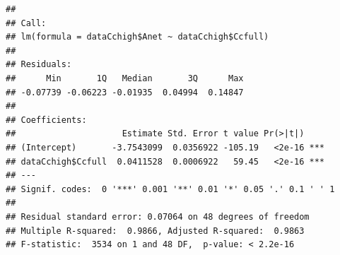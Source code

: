 \documentclass[
]{krantz}
\makeatletter
\newenvironment{Shaded}{\begin{snugshade}}{\end{snugshade}}
\newcommand{\DecValTok}[1]{\textcolor[rgb]{0.00,0.00,0.81}{#1}}
\newcommand{\KeywordTok}[1]{\textcolor[rgb]{0.13,0.29,0.53}{\textbf{#1}}}
\newcommand{\NormalTok}[1]{#1}
\newcommand{\OperatorTok}[1]{\textcolor[rgb]{0.81,0.36,0.00}{\textbf{#1}}}
\newcommand{\StringTok}[1]{\textcolor[rgb]{0.31,0.60,0.02}{#1}}
\newenvironment{kframe}{%
\medskip{}
\setlength{\fboxsep}{.8em}
 \def\at@end@of@kframe{}%
 \ifinner\ifhmode%
  \def\at@end@of@kframe{\end{minipage}}%
  \begin{minipage}{\columnwidth}%
 \fi\fi%
 \def\FrameCommand##1{\hskip\@totalleftmargin \hskip-\fboxsep
 \colorbox{shadecolor}{##1}\hskip-\fboxsep
     \hskip-\linewidth \hskip-\@totalleftmargin \hskip\columnwidth}%
 \MakeFramed {\advance\hsize-\width
   \@totalleftmargin\z@ \linewidth\hsize
   \@setminipage}}%
 {\par\unskip\endMakeFramed%
 \at@end@of@kframe}
\renewenvironment{Shaded}{\begin{kframe}}{\end{kframe}}
\makeatother
\begin{document}
\begin{Shaded}
\end{Shaded}

\begin{verbatim}
## 
## Call:
## lm(formula = dataCchigh$Anet ~ dataCchigh$Ccfull)
## 
## Residuals:
##      Min       1Q   Median       3Q      Max 
## -0.07739 -0.06223 -0.01935  0.04994  0.14847 
## 
## Coefficients:
##                     Estimate Std. Error t value Pr(>|t|)    
## (Intercept)       -3.7543099  0.0356922 -105.19   <2e-16 ***
## dataCchigh$Ccfull  0.0411528  0.0006922   59.45   <2e-16 ***
## ---
## Signif. codes:  0 '***' 0.001 '**' 0.01 '*' 0.05 '.' 0.1 ' ' 1
## 
## Residual standard error: 0.07064 on 48 degrees of freedom
## Multiple R-squared:  0.9866,	Adjusted R-squared:  0.9863 
## F-statistic:  3534 on 1 and 48 DF,  p-value: < 2.2e-16
\end{verbatim}
\end{document}
